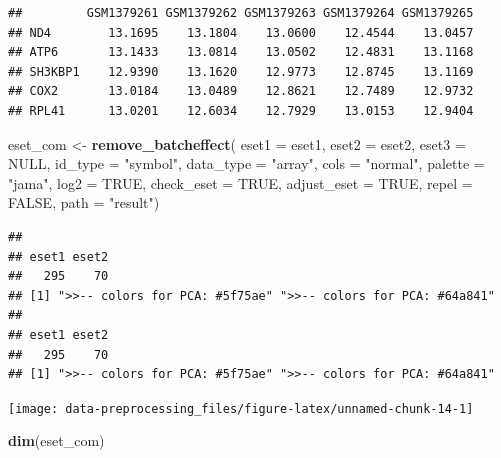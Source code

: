 \documentclass[
  12pt,
]{book}
\newenvironment{Shaded}{\begin{snugshade}}{\end{snugshade}}
\newcommand{\AttributeTok}[1]{\textcolor[rgb]{0.13,0.29,0.53}{#1}}
\newcommand{\ConstantTok}[1]{\textcolor[rgb]{0.56,0.35,0.01}{#1}}
\newcommand{\FunctionTok}[1]{\textcolor[rgb]{0.13,0.29,0.53}{\textbf{#1}}}
\newcommand{\NormalTok}[1]{#1}
\newcommand{\OtherTok}[1]{\textcolor[rgb]{0.56,0.35,0.01}{#1}}
\newcommand{\StringTok}[1]{\textcolor[rgb]{0.31,0.60,0.02}{#1}}
\begin{document}
\begin{verbatim}
##         GSM1379261 GSM1379262 GSM1379263 GSM1379264 GSM1379265
## ND4        13.1695    13.1804    13.0600    12.4544    13.0457
## ATP6       13.1433    13.0814    13.0502    12.4831    13.1168
## SH3KBP1    12.9390    13.1620    12.9773    12.8745    13.1169
## COX2       13.0184    13.0489    12.8621    12.7489    12.9732
## RPL41      13.0201    12.6034    12.7929    13.0153    12.9404
\end{verbatim}

\begin{Shaded}
\begin{Highlighting}[]
\NormalTok{eset\_com }\OtherTok{\textless{}{-}} \FunctionTok{remove\_batcheffect}\NormalTok{( }\AttributeTok{eset1       =}\NormalTok{ eset1,  }
                                \AttributeTok{eset2       =}\NormalTok{ eset2,   }
                                \AttributeTok{eset3       =} \ConstantTok{NULL}\NormalTok{,}
                                \AttributeTok{id\_type     =} \StringTok{"symbol"}\NormalTok{,}
                                \AttributeTok{data\_type   =} \StringTok{"array"}\NormalTok{, }
                                \AttributeTok{cols        =} \StringTok{"normal"}\NormalTok{, }
                                \AttributeTok{palette     =} \StringTok{"jama"}\NormalTok{, }
                                \AttributeTok{log2        =} \ConstantTok{TRUE}\NormalTok{, }
                                \AttributeTok{check\_eset  =} \ConstantTok{TRUE}\NormalTok{,}
                                \AttributeTok{adjust\_eset =} \ConstantTok{TRUE}\NormalTok{,}
                                \AttributeTok{repel       =} \ConstantTok{FALSE}\NormalTok{,}
                                \AttributeTok{path        =} \StringTok{"result"}\NormalTok{)}
\end{Highlighting}
\end{Shaded}

\begin{verbatim}
## 
## eset1 eset2 
##   295    70 
## [1] ">>-- colors for PCA: #5f75ae" ">>-- colors for PCA: #64a841"
## 
## eset1 eset2 
##   295    70 
## [1] ">>-- colors for PCA: #5f75ae" ">>-- colors for PCA: #64a841"
\end{verbatim}

\begin{center}\texttt{[image: data-preprocessing\_files/figure-latex/unnamed-chunk-14-1]} \end{center}

\begin{Shaded}
\begin{Highlighting}[]
\FunctionTok{dim}\NormalTok{(eset\_com)}
\end{Highlighting}
\end{Shaded}
\end{document}
